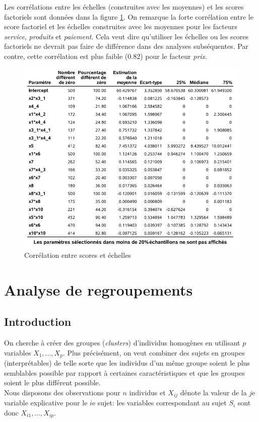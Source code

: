 \documentclass[
  11pt,
  letterpaper,
]{book}
\theoremstyle{definition}
\theoremstyle{definition}
\theoremstyle{definition}
\theoremstyle{definition}
\theoremstyle{remark}
\begin{document}
Les corrélations entre les échelles (construites avec les moyennes) et les scores factoriels sont données dans la figure \ref{fig:fig1p16}. On remarque la forte corrélation entre le score factoriel et les échelles construites avec les moyennes pour les facteurs \emph{service}, \emph{produits} et \emph{paiement}. Cela veut dire qu'utiliser les échelles ou les scores factoriels ne devrait pas faire de différence dans des analyses subséquentes. Par contre, cette corrélation est plus faible (0.82) pour le facteur \emph{prix}.

\begin{figure}

{\centering \includegraphics[width=0.65\linewidth]{figures/01-facto-e16} 

}

\caption{Corrélation entre scores et échelles}\label{fig:fig1p16}
\end{figure}

\hypertarget{analyse-regroupements}{%
\chapter{Analyse de regroupements}\label{analyse-regroupements}}

\hypertarget{introduction-2}{%
\section{Introduction}\label{introduction-2}}

On cherche à créer des groupes (\emph{clusters}) d'individus homogènes en utilisant \(p\) variables \(X_1, \ldots, X_p\). Plus précisément, on veut combiner des sujets en groupes (interprétables) de telle sorte que les individus d'un même groupe soient le plus semblables possible par rapport à certaines caractéristiques et que les groupes soient le plus différent possible.\\
Nous disposons des observations pour \(n\) individus et \(X_{ij}\) dénote la valeur de la \(j\)e variable explicative pour le \(i\)e sujet: les variables correspondant au sujet \(S_i\) sont donc \(X_{i1}, \ldots, X_{ip}\).
\end{document}
